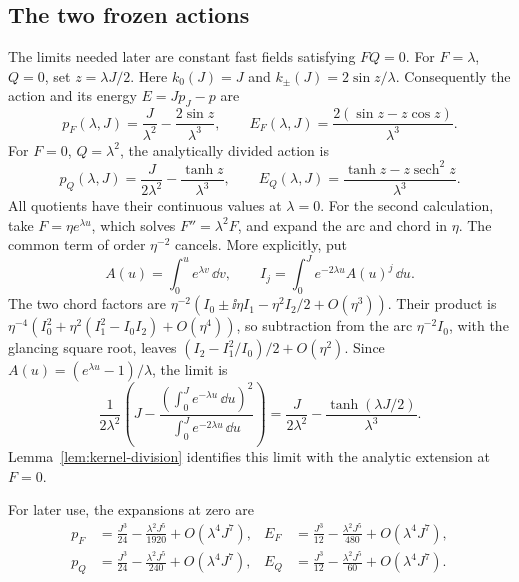 \subsection{The two frozen actions}

The limits needed later are constant fast fields satisfying \(FQ=0\).
For \(F=\lambda\), \(Q=0\), set \(z=\lambda J/2\). Here
\(k_0(J)=J\) and \(k_\pm(J)=2\sin z/\lambda\). Consequently the action
and its energy \(E=Jp_J-p\) are
\begin{equation}\label{eq:frozen-F-energy}
 p_F(\lambda,J)=\frac{J}{\lambda^2}-\frac{2\sin z}{\lambda^3},
 \qquad
 E_F(\lambda,J)=\frac{2(\sin z-z\cos z)}{\lambda^3}.
\end{equation}
For \(F=0\), \(Q=\lambda^2\), the analytically divided action is
\begin{equation}\label{eq:frozen-Q-energy}
 p_Q(\lambda,J)=\frac{J}{2\lambda^2}-\frac{\tanh z}{\lambda^3},
 \qquad
 E_Q(\lambda,J)=\frac{\tanh z-z\operatorname{sech}^2z}{\lambda^3}.
\end{equation}
All quotients have their continuous values at \(\lambda=0\).
For the second calculation, take \(F=\eta e^{\lambda u}\), which solves
\(F''=\lambda^2F\), and expand the arc and chord in \(\eta\). The common
term of order \(\eta^{-2}\) cancels. More explicitly, put
\[
 A(u)=\int_0^u e^{\lambda v}\,\dd v,
 \qquad I_j=\int_0^J e^{-2\lambda u}A(u)^j\,\dd u.
\]
The two chord factors are
\(\eta^{-2}(I_0\pm\ii\eta I_1-\eta^2I_2/2+O(\eta^3))\).
Their product is
\(\eta^{-4}(I_0^2+\eta^2(I_1^2-I_0I_2)+O(\eta^4))\), so subtraction
from the arc \(\eta^{-2}I_0\), with the glancing square root, leaves
\((I_2-I_1^2/I_0)/2+O(\eta^2)\). Since
\(A(u)=(e^{\lambda u}-1)/\lambda\), the limit is
\[
 \frac1{2\lambda^2}
 \left(J-\frac{\left(\int_0^J e^{-\lambda u}\,\dd u\right)^2}
 {\int_0^J e^{-2\lambda u}\,\dd u}\right)
 =\frac{J}{2\lambda^2}-\frac{\tanh(\lambda J/2)}{\lambda^3}.
\]
Lemma~\ref{lem:kernel-division} identifies this limit with the analytic
extension at \(F=0\).

For later use, the expansions at zero are
\begin{align}
 p_F&=\frac{J^3}{24}-\frac{\lambda^2J^5}{1920}+O(\lambda^4J^7),&
 E_F&=\frac{J^3}{12}-\frac{\lambda^2J^5}{480}+O(\lambda^4J^7),
 \label{cone:F-series}\\
 p_Q&=\frac{J^3}{24}-\frac{\lambda^2J^5}{240}+O(\lambda^4J^7),&
 E_Q&=\frac{J^3}{12}-\frac{\lambda^2J^5}{60}+O(\lambda^4J^7).
 \label{cone:Q-series}
\end{align}


